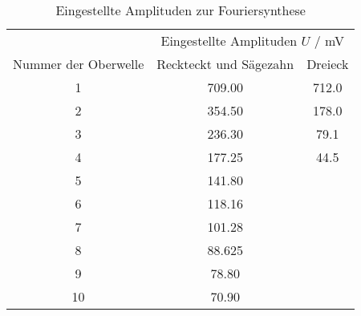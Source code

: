 \begin{table}[!htp]
\centering
\caption{Eingestellte Amplituden zur Fouriersynthese}
\label{tab:eingestellt}
\begin{tabular}{c c c}
\toprule
 & \multicolumn{2}{c}{Eingestellte Amplituden $U$ / mV } \\
 \cmidrule(lr){2-3}
{Nummer der Oberwelle} & {Reckteckt und Sägezahn} & {Dreieck} \\
\midrule
1 & 709.00 & 712.0\\
2 & 354.50 & 178.0\\
3 & 236.30 & 79.1\\
4 & 177.25 & 44.5\\
5 & 141.80 & \\
6 & 118.16 & \\
7 & 101.28 & \\
8 & 88.625 & \\
9 & 78.80  & \\
10 & 70.90 & \\
\bottomrule
\end{tabular}
\end{table}